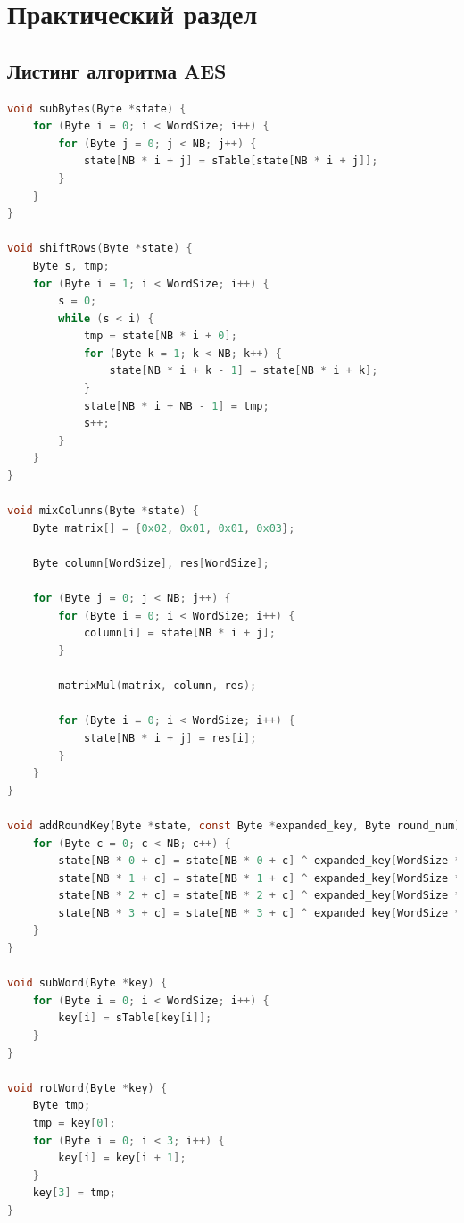 \chapter{Практический раздел}

\section{Листинг алгоритма AES}

\begin{lstlisting}[language=C, label=lst:aes, caption={Реализация алгоритма AES}]
void subBytes(Byte *state) {
    for (Byte i = 0; i < WordSize; i++) {
        for (Byte j = 0; j < NB; j++) {
            state[NB * i + j] = sTable[state[NB * i + j]];
        }
    }
}

void shiftRows(Byte *state) {
    Byte s, tmp;
    for (Byte i = 1; i < WordSize; i++) {
        s = 0;
        while (s < i) {
            tmp = state[NB * i + 0];
            for (Byte k = 1; k < NB; k++) {
                state[NB * i + k - 1] = state[NB * i + k];
            }
            state[NB * i + NB - 1] = tmp;
            s++;
        }
    }
}

void mixColumns(Byte *state) {
    Byte matrix[] = {0x02, 0x01, 0x01, 0x03};

    Byte column[WordSize], res[WordSize];

    for (Byte j = 0; j < NB; j++) {
        for (Byte i = 0; i < WordSize; i++) {
            column[i] = state[NB * i + j];
        }

        matrixMul(matrix, column, res);

        for (Byte i = 0; i < WordSize; i++) {
            state[NB * i + j] = res[i];
        }
    }
}

void addRoundKey(Byte *state, const Byte *expanded_key, Byte round_num) {
    for (Byte c = 0; c < NB; c++) {
        state[NB * 0 + c] = state[NB * 0 + c] ^ expanded_key[WordSize * NB * round_num + WordSize * c + 0];
        state[NB * 1 + c] = state[NB * 1 + c] ^ expanded_key[WordSize * NB * round_num + WordSize * c + 1];
        state[NB * 2 + c] = state[NB * 2 + c] ^ expanded_key[WordSize * NB * round_num + WordSize * c + 2];
        state[NB * 3 + c] = state[NB * 3 + c] ^ expanded_key[WordSize * NB * round_num + WordSize * c + 3];
    }
}

void subWord(Byte *key) {
    for (Byte i = 0; i < WordSize; i++) {
        key[i] = sTable[key[i]];
    }
}

void rotWord(Byte *key) {
    Byte tmp;
    tmp = key[0];
    for (Byte i = 0; i < 3; i++) {
        key[i] = key[i + 1];
    }
    key[3] = tmp;
}


\end{lstlisting}

